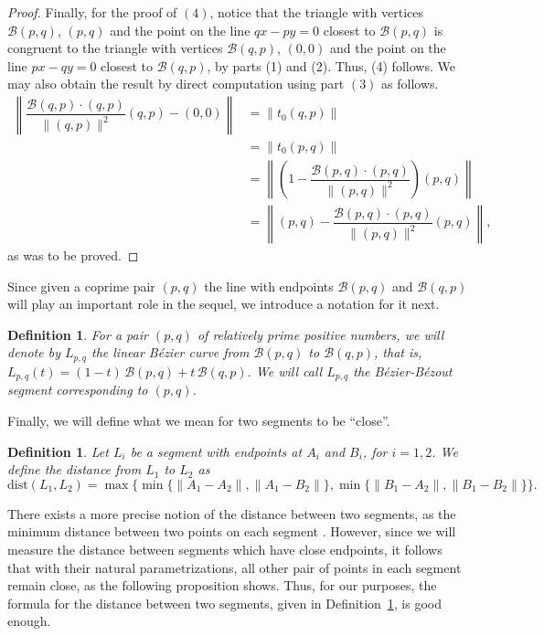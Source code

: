 \documentclass[12pt,english]{article}
\newcommand{\B}{\mathcal B}
\newtheorem{definition}[theorem]{Definition}
\begin{document}
\begin{proof}
 
 
  Finally, for the proof of $(4)$, notice that the triangle with vertices $\B(p,q)$, $(p,q)$ and the point on the line $qx-py=0$ closest to $\B(p,q)$ is congruent to the  triangle with vertices $\B(q,p)$, $(0,0)$ and the point on the line $px-qy=0$ closest to $\B(q,p)$, by parts (1) and (2). Thus, (4) follows.  We may also obtain the result by direct computation using part $(3)$  as follows.
\begin{align*}
    \left\|\dfrac{\B(q,p)\cdot (q,p)}{\|(q,p)\|^2} (q,p) -(0,0)  \right\|
    &= \left\| t_0 (q,p)   \right\|  \\
    &=\left\| t_0 (p,q)   \right\|  \\
    &=\left\|
    \left(1-\dfrac{\B(p,q)\cdot (p,q)}{\|(p,q)\|^2}\right) (p,q)
    \right\|\\
    &=\left\|(p,q)-
    \dfrac{\B(p,q)\cdot (p,q)}{\|(p,q)\|^2} (p,q)
    \right\|,
\end{align*}
as was to be proved.
\end{proof}


Since given a coprime pair $(p,q)$ the line with endpoints $\B(p,q)$ and $\B(q,p)$ will play an important role in the sequel, we introduce a notation for it next.

\begin{definition}\label{bezoutlines}
For a pair $(p,q)$ of relatively prime positive numbers, we will denote by  $L_{p,q}$  the linear B\'ezier curve from $\B(p,q)$ to  $\B(q,p)$, that is, $L_{p,q}(t)=(1-t)\,\B(p,q)+t\, \B(q,p)$. We will call $L_{p,q}$ the B\'ezier-B\'ezout segment corresponding to $(p,q)$.
\end{definition}


Finally, we will define what we mean for two segments to be ``close''.

\begin{definition}\label{segmentdistance}
Let $L_i$ be a segment with endpoints at $A_i$ and $B_i$, for $i=1,2$. We 
define the distance from $L_1$ to $L_2$
as \[
\mathrm{dist}(L_1,L_2)=\max\bigl\{
        \min\{\|A_1-A_2\|,\|A_1-B_2\|\},
        \min\{\|B_1-A_2\|,\|B_1-B_2\|\}
        \bigr\}.
\]
\end{definition}

There exists a more precise notion of the distance between two segments, as the minimum distance between two points on each segment \cite{Allen}. However,  since we will measure the distance between segments which have close endpoints, it follows that with their natural parametrizations, all other pair of points in each segment remain close, as the following proposition shows. Thus, for our purposes, the formula for the distance between two segments, given in Definition~\ref{segmentdistance}, is good enough.
\end{document}
